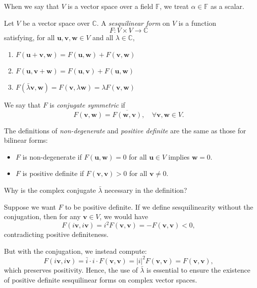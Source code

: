 When we say that \( V \) is a vector space over a field \( \mathbb{F} \), we treat \( \alpha \in \mathbb{F} \) as a scalar.

\begin{definition}\label{def:sesquilinear}
Let \( V \) be a vector space over \( \mathbb{C} \). A \emph{sesquilinear form} on \( V \) is a function
\[
F : V \times V \to \mathbb{C}
\]
satisfying, for all \( \mathbf{u}, \mathbf{v}, \mathbf{w} \in V \) and all \( \lambda \in \mathbb{C} \),
\begin{enumerate}
    \item \( F(\mathbf{u} + \mathbf{v}, \mathbf{w}) = F(\mathbf{u}, \mathbf{w}) + F(\mathbf{v}, \mathbf{w}) \)
    \item \( F(\mathbf{u}, \mathbf{v} + \mathbf{w}) = F(\mathbf{u}, \mathbf{v}) + F(\mathbf{u}, \mathbf{w}) \)
    \item \( F(\bar{\lambda} \mathbf{v}, \mathbf{w}) = F(\mathbf{v}, \lambda \mathbf{w}) = \lambda F(\mathbf{v}, \mathbf{w}) \)
\end{enumerate}

We say that \( F \) is \emph{conjugate symmetric} if
\[
F(\mathbf{v}, \mathbf{w}) = \overline{F(\mathbf{w}, \mathbf{v})}, \quad \forall \mathbf{v}, \mathbf{w} \in V.
\]

The definitions of \emph{non-degenerate} and \emph{positive definite} are the same as those for bilinear forms:
\begin{itemize}
    \item \( F \) is non-degenerate if \( F(\mathbf{u}, \mathbf{w}) = 0 \) for all \( \mathbf{u} \in V \) implies \( \mathbf{w} = 0 \).
    \item \( F \) is positive definite if \( F(\mathbf{v}, \mathbf{v}) > 0 \) for all \( \mathbf{v} \neq 0 \).
\end{itemize}
\end{definition}

\begin{remark}
Why is the complex conjugate \( \bar{\lambda} \) necessary in the definition?

Suppose we want \( F \) to be positive definite. If we define sesquilinearity without the conjugation, then for any \( \mathbf{v} \in V \), we would have
\[
F(i\mathbf{v}, i\mathbf{v}) = i^2 F(\mathbf{v}, \mathbf{v}) = -F(\mathbf{v}, \mathbf{v}) < 0,
\]
contradicting positive definiteness.

But with the conjugation, we instead compute:
\[
F(i\mathbf{v}, i\mathbf{v}) = \bar{i} \cdot i \cdot F(\mathbf{v}, \mathbf{v}) = |i|^2 F(\mathbf{v}, \mathbf{v}) = F(\mathbf{v}, \mathbf{v}),
\]
which preserves positivity. Hence, the use of \( \bar{\lambda} \) is essential to ensure the existence of positive definite sesquilinear forms on complex vector spaces.
\end{remark}

